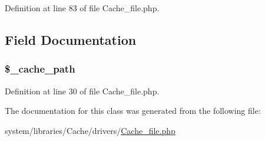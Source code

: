Definition at line 83 of file Cache\-\_\-file.\-php.



\subsection{Field Documentation}
\hypertarget{class_c_i___cache__file_ae9407d6ae1ddd132cca3c7f855f89dfe}{
\subsubsection[{\$\-\_\-cache\-\_\-path}]{\setlength{\rightskip}{0pt plus 5cm}\$\-\_\-cache\-\_\-path\hspace{0.3cm}{\ttfamily [protected]}}}\label{class_c_i___cache__file_ae9407d6ae1ddd132cca3c7f855f89dfe}


Definition at line 30 of file Cache\-\_\-file.\-php.



The documentation for this class was generated from the following file\-:\begin{DoxyCompactItemize}
\item 
system/libraries/\-Cache/drivers/\hyperlink{_cache__file_8php}{Cache\-\_\-file.\-php}\end{DoxyCompactItemize}
